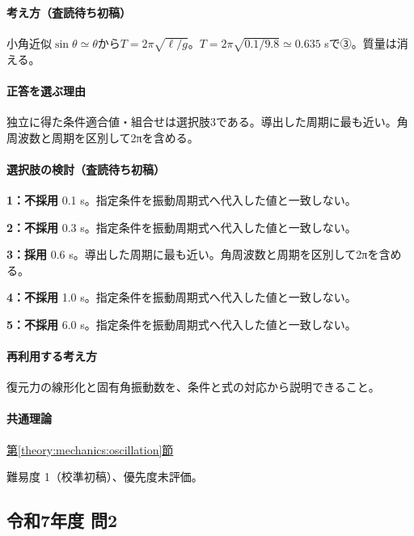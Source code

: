 \paragraph{考え方（査読待ち初稿）} 小角近似\(\sin\theta\simeq\theta\)から\(T=2\pi\sqrt{\ell/g}\)。\(T=2\pi\sqrt{0.1/9.8}\simeq0.635\) sで③。質量は消える。

\paragraph{正答を選ぶ理由} 独立に得た条件適合値・組合せは選択肢3である。導出した周期に最も近い。角周波数と周期を区別して2πを含める。

\paragraph{選択肢の検討（査読待ち初稿）}\mbox{}\par

\noindent\textbf{1：不採用} 0.1 s。指定条件を振動周期式へ代入した値と一致しない。\par

\noindent\textbf{2：不採用} 0.3 s。指定条件を振動周期式へ代入した値と一致しない。\par

\noindent\textbf{3：採用} 0.6 s。導出した周期に最も近い。角周波数と周期を区別して2πを含める。\par

\noindent\textbf{4：不採用} 1.0 s。指定条件を振動周期式へ代入した値と一致しない。\par

\noindent\textbf{5：不採用} 6.0 s。指定条件を振動周期式へ代入した値と一致しない。\par

\paragraph{再利用する考え方} 復元力の線形化と固有角振動数を、条件と式の対応から説明できること。

\paragraph{共通理論} \hyperref[theory:mechanics:oscillation]{第\ref*{theory:mechanics:oscillation}節}

\par 難易度 1（校準初稿）、優先度未評価。

\subsection{令和7年度 問2}
\label{q:r07-reg-applied-02}

